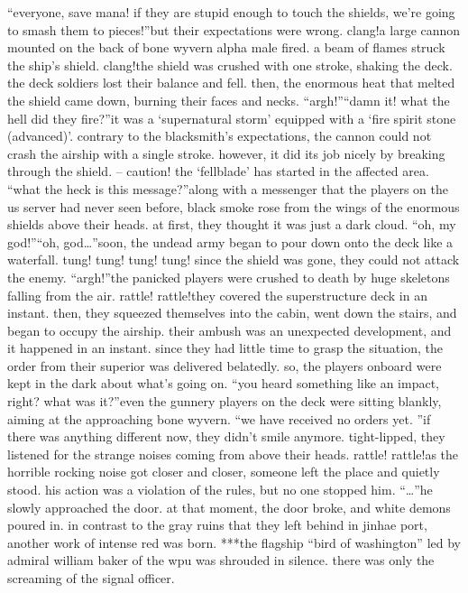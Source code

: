 “everyone, save mana! if they are stupid enough to touch the shields, we’re going to smash them to pieces!”but their expectations were wrong.
clang!a large cannon mounted on the back of bone wyvern alpha male fired.
 a beam of flames struck the ship’s shield.
clang!the shield was crushed with one stroke, shaking the deck.
 the deck soldiers lost their balance and fell.
 then, the enormous heat that melted the shield came down, burning their faces and necks.
“argh!”“damn it! what the hell did they fire?”it was a ‘supernatural storm’ equipped with a ‘fire spirit stone (advanced)’.
 contrary to the blacksmith’s expectations, the cannon could not crash the airship with a single stroke.
however, it did its job nicely by breaking through the shield.
– caution! the ‘fellblade’ has started in the affected area.
“what the heck is this message?”along with a messenger that the players on the us server had never seen before, black smoke rose from the wings of the enormous shields above their heads.
at first, they thought it was just a dark cloud.
“oh, my god!”“oh, god…”soon, the undead army began to pour down onto the deck like a waterfall.
tung! tung! tung! tung!
since the shield was gone, they could not attack the enemy.
“argh!”the panicked players were crushed to death by huge skeletons falling from the air.
rattle! rattle!they covered the superstructure deck in an instant.
 then, they squeezed themselves into the cabin, went down the stairs, and began to occupy the airship.
their ambush was an unexpected development, and it happened in an instant.
since they had little time to grasp the situation, the order from their superior was delivered belatedly.
 so, the players onboard were kept in the dark about what’s going on.
“you heard something like an impact, right? what was it?”even the gunnery players on the deck were sitting blankly, aiming at the approaching bone wyvern.
“we have received no orders yet.
”if there was anything different now, they didn’t smile anymore.
 tight-lipped, they listened for the strange noises coming from above their heads.
rattle! rattle!as the horrible rocking noise got closer and closer, someone left the place and quietly stood.
 his action was a violation of the rules, but no one stopped him.
“…”he slowly approached the door.
at that moment, the door broke, and white demons poured in.
in contrast to the gray ruins that they left behind in jinhae port, another work of intense red was born.
***the flagship “bird of washington” led by admiral william baker of the wpu was shrouded in silence.
 there was only the screaming of the signal officer.
